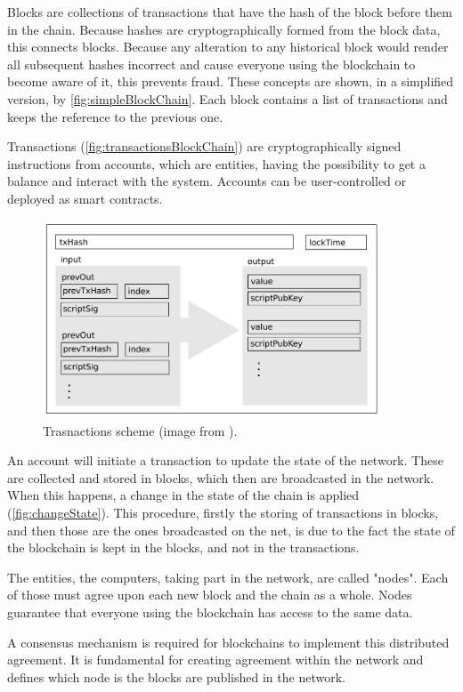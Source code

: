 Blocks are collections of transactions that have the hash of the block before them in the chain.
Because hashes are cryptographically formed from the block data, this connects blocks.
Because any alteration to any historical block would render all subsequent hashes incorrect and cause everyone using the blockchain to become aware of it, this prevents fraud. 
These concepts are shown, in a simplified version, by \autoref{fig:simpleBlockChain}. Each block contains a list of transactions and keeps the reference to the previous one.

Transactions (\autoref{fig:transactionsBlockChain}) are cryptographically signed instructions from accounts, which are entities, having the possibility to get a balance and interact with the system. 
Accounts can be user-controlled or deployed as smart contracts.

\begin{figure}
    \centering
    \includegraphics[width=10cm]{logos/Transactions.png}
    \caption{Trasnactions scheme (image from \cite{BlockChain1}).}
    \label{fig:transactionsBlockChain}
\end{figure}

An account will initiate a transaction to update the state of the network. 
These are collected and stored in blocks, which then are broadcasted in the network. 
When this happens, a change in the state of the chain is applied (\autoref{fig:changeState}). 
This procedure, firstly the storing of transactions in blocks, and then those are the ones broadcasted on the net, 
is due to the fact the state of the blockchain is kept in the blocks, and not in the transactions.

The entities, the computers, taking part in the network, are called "nodes". 
Each of those must agree upon each new block and the chain as a whole. 
Nodes guarantee that everyone using the blockchain has access to the same data.

A consensus mechanism is required for blockchains to implement this distributed agreement. 
It is fundamental for creating agreement within the network and defines 
which node is the blocks are published in the network.

